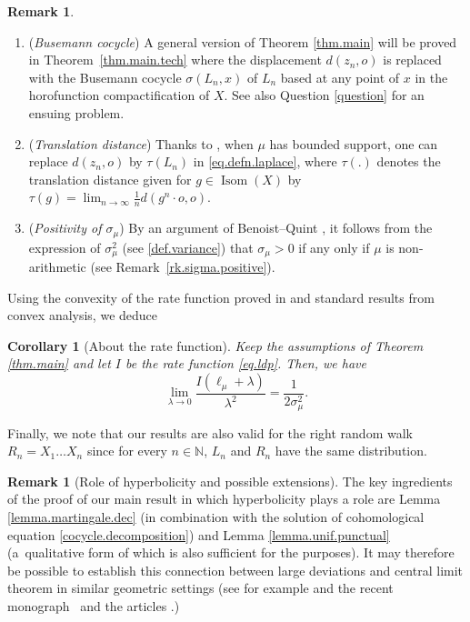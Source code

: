 \documentclass[JEP,XML,SOM,Unicode,published]{cedram}
\theoremstyle{plain}
\newtheorem{corollary}[theorem]{Corollary}
\theoremstyle{definition}
\newtheorem{remark}[theorem]{Remark}
\newcommand\N{\mathbb{N}}
\DeclareMathOperator\Isom{Isom}
\begin{document}
\skpt
\begin{remark}
\begin{enumerate}
\item
(\textit{Busemann cocycle}) A general version of Theorem \ref{thm.main} will be proved in Theorem~\ref{thm.main.tech} where the displacement $d(z_n, o)$ is replaced with the Busemann cocycle $\sigma(L_n, x)$ of $L_n$ based at any point of $x$ in the horofunction compactification of $X$. See also Question \ref{question} for an ensuing problem.

\item
(\textit{Translation distance}) Thanks to \cite[Th.\,1.3]{BMSS}, when $\mu$ has bounded support, one can replace $d(z_n,o)$ by $\tau(L_n)$ in \eqref{eq.defn.laplace}, where $\tau(.)$ denotes the translation distance given for $g \in \Isom(X)$ by $\tau(g)=\lim_{n \to \infty}\frac{1}{n}d(g^n \cdot o,o)$.

\item
(\textit{Positivity of $\sigma_\mu$}) By an argument of Benoist--Quint \cite{BQ.hyperbolic}, it follows from the expression of $\sigma_\mu^2$ (see \eqref{def.variance}) that $\sigma_\mu>0$ if any only if $\mu$ is non-arithmetic (see Remark~\ref{rk.sigma.positive}).
\end{enumerate}
\end{remark}

Using the convexity of the rate function proved in \cite{BMSS} and standard results from convex analysis, we deduce
\begin{corollary}[About the rate function]\label{corol.rate.function}
Keep the assumptions of Theorem \ref{thm.main} and let $I$ be the rate function \eqref{eq.ldp}. Then, we have\vspace*{-3pt}
\[
\lim_{\lambda \to 0}\frac{I(\ell_\mu+\lambda)}{\lambda^2}=\frac{1}{2\sigma_\mu^2}.
\]
\end{corollary}

Finally, we note that our results are also valid for the right random walk $R_n=X_1\ldots X_n$ since for every $n \in \N$, $L_n$ and $R_n$ have the same distribution.

\begin{remark}[Role of hyperbolicity and possible extensions]
The key ingredients of the proof of our main result in which hyperbolicity plays a role are Lemma \ref{lemma.martingale.dec} (in combination with the solution of cohomological equation \eqref{cocycle.decomposition}) and Lemma \ref{lemma.unif.punctual} (a~qualitative form of which is also sufficient for the purposes). It may therefore be possible to establish this connection between large deviations and central limit theorem in similar geometric settings (see for example \cite{horbez} and the recent monograph~\cite{choi} and the articles \cite{choi1,choi2}.)
\end{remark}
\end{document}
